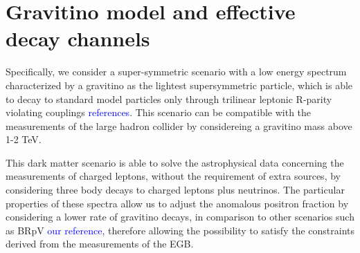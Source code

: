 \documentclass[a4paper,11pt]{article}
\newcommand*{\blue}{\textcolor{blue}}
\begin{document}


 
\section{Gravitino model and effective decay channels}
\label{gdecay}

Specifically, we consider a super-symmetric scenario with a low energy spectrum characterized by a gravitino as the lightest supersymmetric particle, which is able to decay to standard model particles only through trilinear leptonic R-parity violating couplings \blue{references}. This scenario can be compatible with the measurements of the large hadron collider by considereing a gravitino mass above 1-2 TeV. 

This dark matter scenario is able to solve the astrophysical data concerning the measurements of charged leptons, without the requirement of extra sources, by considering three body decays to charged leptons plus neutrinos. The particular properties of these spectra allow us to adjust the anomalous positron fraction by considering a lower rate of gravitino decays, in comparison to other scenarios such as BRpV \blue{our reference}, therefore allowing the possibility to satisfy the constraints derived from the measurements of the EGB.
\end{document}
